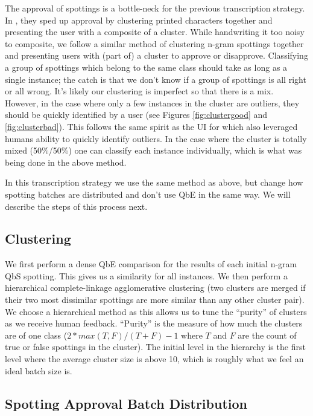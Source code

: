 \documentclass[ms,electronic,twosidetoc,letterpaper,chaptercenter,parttop,lof,lot]{byumsphd}
\begin{document}
The approval of spottings is a bottle-neck for the previous transcription strategy. In \cite{Retsinas2015}, they sped up approval by clustering printed characters together and presenting the user with a composite of a cluster. While handwriting it too noisy to composite, we follow a similar method of clustering n-gram spottings together and presenting users with (part of) a cluster to approve or disapprove. Classifying a group of spottings which belong to the same class should take as long as a single instance; the catch is that we don't know if a group of spottings is all right or all wrong. It's likely our clustering is imperfect so that there is a mix. However, in the case where only a few instances in the cluster are outliers, they should be quickly identified by a user (see Figures \ref{fig:clustergood} and \ref{fig:clusterbad}). This follows the same spirit as the UI for \cite{Clawson2014} which also leveraged humans ability to quickly identify outliers. In the case where the cluster is totally mixed (50\%/50\%) one can classify each instance individually, which is what was being done in the above method.

In this transcription strategy we use the same method as above, but change how spotting batches are distributed and don't use QbE in the same way. We will describe the steps of this process next.

\subsection{Clustering}

We first perform a dense QbE comparison for the results of each initial n-gram QbS spotting. This gives us a similarity for all instances. We then perform a hierarchical complete-linkage agglomerative clustering (two clusters are merged if their two most dissimilar spottings are more similar than any other cluster pair). We choose a hierarchical method as this allows us to tune the ``purity'' of clusters as we receive human feedback. ``Purity'' is the measure of how much the clusters are of one class ($2*max(T,F)/(T+F)-1$ where $T$ and $F$ are the count of true or false spottings in the cluster). The initial level in the hierarchy is the first level where the average cluster size is above 10, which is roughly what we feel an ideal batch size is.





\subsection{Spotting Approval Batch Distribution}
\end{document}
